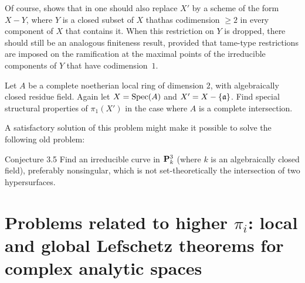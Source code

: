 Of course,  shows that in  one should also
replace $X'$ by a scheme of the form $X-Y$, where $Y$ is a closed subset
of $X$ that\pageoriginale has codimension $\geq 2$ in every component of $X$ that
contains it. When this restriction on $Y$ is dropped, there should still
be an analogous finiteness result, provided that \og tame\fg-type
restrictions are imposed on the ramification at the maximal points of
the irreducible components of $Y$ that have codimension~$1$.

\begin{probleme} \label{XIII.3.4}
Let $A$ be a complete noetherian local ring of dimension $2$, with
algebraically closed residue field. Again let $X=\operatorname{Spec}(A)$ and
$X'=X-\{\mathfrak{a}\}$. Find special structural properties of $\pi_1(X')$ in
the case where $A$ is a complete intersection.
\end{probleme}

A satisfactory solution of this problem might make it possible to solve
the following old problem:

\label{XIII.3.5}
\begin{enonce*}{Conjecture 3.5\ndemark}
Find an irreducible curve in $\mathbf P^3_k$ (where $k$ is an algebraically
closed field), preferably nonsingular, which is not set-theoretically the
intersection of two hypersurfaces.
\end{enonce*}

\section[Problems related to higher $\pi_i$]{Problems related to higher
$\pi_i$: local and global Lefschetz theorems for complex analytic
spaces\protect\ndemark} \label{XIII.4}

